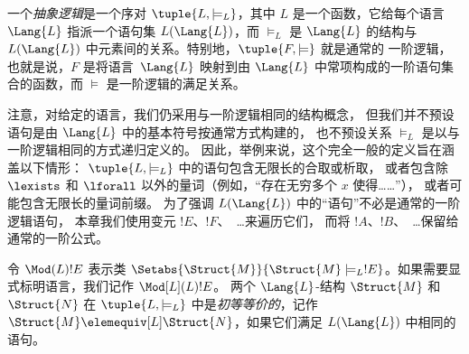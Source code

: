 \documentclass[../../../include/open-logic-section]{subfiles}
\begin{document}

\begin{defn}
一个\emph{抽象逻辑}是一个序对 $\tuple{L, \models_L}$，其中 $L$
是一个函数，它给每个语言~$\Lang{L}$ 指派一个语句集
$L(\Lang{L})$，而 $\models_L$ 是 $\Lang{L}$ 的结构与
$L(\Lang{L})$ 中元素间的关系。特别地，$\tuple{F, \models}$ 就是通常的
一阶逻辑，也就是说，$F$ 是将语言~$\Lang{L}$ 映射到由 $\Lang{L}$ 中常项构成的一阶语句集合的函数，而 $\models$ 是一阶逻辑的满足关系。
\end{defn}

注意，对给定的语言，我们仍采用与一阶逻辑相同的结构概念，
但我们并不预设语句是由 $\Lang{L}$ 中的基本符号按通常方式构建的，
也不预设关系 $\models_L$ 是以与一阶逻辑相同的方式递归定义的。
因此，举例来说，这个完全一般的定义旨在涵盖以下情形：
$\tuple{L,\models_L}$ 中的语句包含无限长的合取或析取，
或者包含除 $\lexists$ 和 $\lforall$ 以外的量词（例如，“存在无穷多个 $x$ 使得……”），
或者可能包含无限长的量词前缀。
为了强调 $L(\Lang{L})$ 中的“语句”不必是通常的一阶逻辑语句，
本章我们使用变元 $!E$、$!F$、~\dots 来遍历它们，
而将 $!A$、$!B$、~\dots 保留给通常的一阶公式。

\begin{defn}
令 $\Mod(L){!E}$ 表示类 $\Setabs{\Struct{M}}{\Struct{M}
  \models_L !E}$。如果需要显式标明语言，我们记作 $\Mod[L](L){!E}$。
两个 $\Lang{L}$-结构 $\Struct{M}$ 和 $\Struct{N}$ 在 $\tuple{L, \models_L}$ 中是\emph{初等等价的}，记作 $\Struct{M} \elemequiv[L] \Struct{N}$，如果它们满足 $L(\Lang{L})$ 中相同的语句。
\end{defn}
\end{document}
